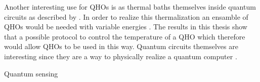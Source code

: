 Another interesting use for QHOs is as thermal baths themselves inside quantum circuits as described by \cite{Pekola:2024}. In order to realize this thermalization an ensamble of QHOs would be needed with variable energies \cite{Pekola:2024}. The results in this thesis show that a possible protocol to control the temperature of a QHO which therefore would allow QHOs to be used in this way. Quantum circuits themselves are interesting since they are a way to physically realize a quantum computer \cite{Nielsen:2010}. 



Quantum sensing\\
